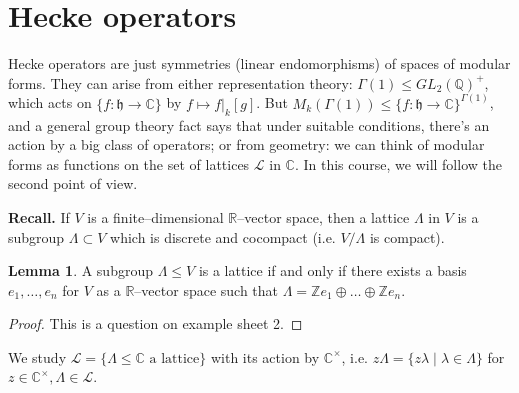 \documentclass{article}
\theoremstyle{definition}
\newtheorem{lemma}[theorem]{Lemma}
\begin{document}
\section{Hecke operators}

Hecke operators are just symmetries (linear endomorphisms) of spaces of modular forms. They can arise from either representation theory: $\Gamma(1) \le GL_2(\mathbb{Q})^{+}$, which acts on $\{f : \mathfrak{h} \to \mathbb{C}\}$ by $f \mapsto f|_k[g]$. But $M_k(\Gamma(1)) \le \{f : \mathfrak{h} \to \mathbb{C}\}^{\Gamma(1)}$, and a general group theory fact says that under suitable conditions, there's an action by a big class of operators; or from geometry: we can think of modular forms as functions on the set of lattices $\mathcal{L}$ in $\mathbb{C}$. In this course, we will follow the second point of view.
\vspace{1mm}
 
\textbf{Recall.} If $V$ is a finite--dimensional $\mathbb{R}$--vector space, then a lattice $\Lambda$ in $V$ is a subgroup $\Lambda \subset V$ which is discrete and cocompact (i.e. $V/\Lambda$ is compact).

\begin{lemma}
    A subgroup $\Lambda \le V$ is a lattice if and only if there exists a basis $e_1,\ldots,e_n$ for $V$ as a $\mathbb{R}$--vector space such that $\Lambda = \mathbb{Z} e_1 \oplus \ldots\oplus \mathbb{Z}e_n$.
\end{lemma}
\begin{proof}
    This is a question on example sheet 2.
\end{proof}
We study $\mathcal{L} = \{\Lambda \le \mathbb{C} \text{ a lattice}\}$ with its action by $\mathbb{C}^\times$, i.e. $z \Lambda = \{z \lambda \mid \lambda \in \Lambda\}$ for $z \in \mathbb{C}^\times, \Lambda \in \mathcal{L}$.
\end{document}
